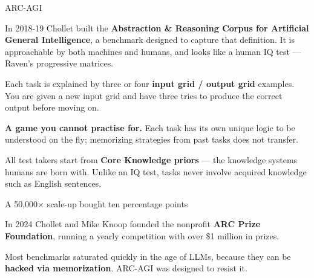 \documentclass[aspectratio=169,11pt,t]{beamer}
\begin{document}
\begin{frame}[shrink=25]{ARC-AGI}
{\fontsize{9.4}{12.6}\selectfont\color{fg2}In 2018-19 Chollet built the \textbf{Abstraction \& Reasoning Corpus for Artificial General Intelligence}, a benchmark designed to capture that definition. It is approachable by both machines and humans, and looks like a human IQ test --- Raven's progressive matrices.\par}\vskip 4pt
{\fontsize{9.4}{12.6}\selectfont\color{fg2}Each task is explained by three or four \textbf{input grid / output grid} examples. You are given a new input grid and have three tries to produce the correct output before moving on.\par}\vskip 4pt
\begin{minipage}[t]{0.494\textwidth}
\begin{icardaccent}
\textbf{A game you cannot practise for.} Each task has its own unique logic to be understood on the fly; memorizing strategies from past tasks does not transfer.
\end{icardaccent}
\end{minipage}%
\hfill
\begin{minipage}[t]{0.494\textwidth}
\begin{icardaccent}
All test takers start from \textbf{Core Knowledge priors} --- the knowledge systems humans are born with. Unlike an IQ test, tasks never involve acquired knowledge such as English sentences.
\end{icardaccent}
\end{minipage}%
\end{frame}

\begin{frame}[shrink=25]{A 50,000$\times$ scale-up bought ten percentage points}
{\fontsize{9.4}{12.6}\selectfont\color{fg2}In 2024 Chollet and Mike Knoop founded the nonprofit \textbf{ARC Prize Foundation}, running a yearly competition with over \$1 million in prizes.\par}\vskip 4pt
\begin{minipage}[t]{0.3253\textwidth}
\end{minipage}%
\hfill
\begin{minipage}[t]{0.3253\textwidth}
\end{minipage}%
\hfill
\begin{minipage}[t]{0.3253\textwidth}
\end{minipage}%
\begin{iband}[amber]
Most benchmarks saturated quickly in the age of LLMs, because they can be \textbf{hacked via memorization}. ARC-AGI was designed to resist it. 
\end{iband}
\end{frame}
\end{document}
